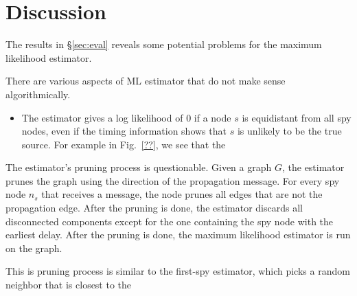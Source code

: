 \section{Discussion}

The results in \S\ref{sec:eval} reveals some potential problems for the maximum likelihood estimator. 

There are various aspects of ML estimator that do not make sense algorithmically. 

\begin{itemize}
\item The estimator gives a log likelihood of 0 if a node $s$ is equidistant from all spy nodes, even if the timing information shows that $s$ is unlikely to be the true source. For example in Fig.~\ref{??}, we see that the ~~~~
\end{itemize}

The estimator's pruning process is questionable. Given a graph $G$, the estimator prunes the graph using the direction of the propagation message. For every spy node $n_s$ that receives a message, the node prunes all edges that are not the propagation edge. After the pruning is done, the estimator discards all disconnected components except for the one containing the spy node with the earliest delay. After the pruning is done, the maximum likelihood estimator is run on the graph.

This is pruning process is similar to the first-spy estimator, which picks a random neighbor that is closest to the 
